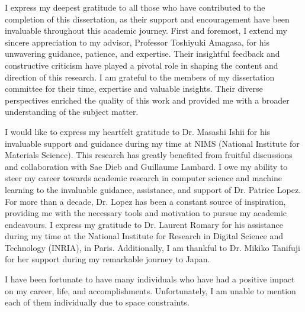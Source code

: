I express my deepest gratitude to all those who have contributed to the completion of this dissertation, as their support and encouragement have been invaluable throughout this academic journey.
First and foremost, I extend my sincere appreciation to my advisor, Professor Toshiyuki Amagasa, for his unwavering guidance, patience, and expertise. Their insightful feedback and constructive criticism have played a pivotal role in shaping the content and direction of this research.
I am grateful to the members of my dissertation committee for their time, expertise and valuable insights. Their diverse perspectives enriched the quality of this work and provided me with a broader understanding of the subject matter.

I would like to express my heartfelt gratitude to Dr. Masashi Ishii for his invaluable support and guidance during my time at NIMS (National Institute for Materials Science).
This research has greatly benefited from fruitful discussions and collaboration with Sae Dieb and Guillaume Lambard. 
I owe my ability to steer my career towards academic research in computer science and machine learning to the invaluable guidance, assistance, and support of Dr. Patrice Lopez. For more than a decade, Dr. Lopez has been a constant source of inspiration, providing me with the necessary tools and motivation to pursue my academic endeavours.
I express my gratitude to Dr. Laurent Romary for his assistance during my time at the National Institute for Research in Digital Science and Technology (INRIA), in Paris. Additionally, I am thankful to Dr. Mikiko Tanifuji for her support during my remarkable journey to Japan. 

I have been fortunate to have many individuals who have had a positive impact on my career, life, and accomplishments. Unfortunately, I am unable to mention each of them individually due to space constraints.